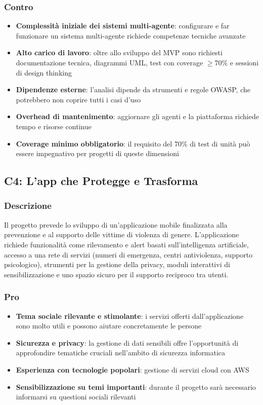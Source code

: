 \documentclass[11pt,a4paper]{article}
\begin{document}
\subsubsection{Contro}
\begin{itemize}
    \item \textbf{Complessità iniziale dei sistemi multi-agente}: configurare e far funzionare un sistema multi-agente richiede competenze tecniche avanzate
    \item \textbf{Alto carico di lavoro}: oltre allo sviluppo del MVP sono richiesti documentazione tecnica, diagrammi UML, test con coverage $\geq$70\% e sessioni di design thinking
    \item \textbf{Dipendenze esterne}: l'analisi dipende da strumenti e regole OWASP, che potrebbero non coprire tutti i casi d'uso
    \item \textbf{Overhead di mantenimento}: aggiornare gli agenti e la piattaforma richiede tempo e risorse continue
    \item \textbf{Coverage minimo obbligatorio}: il requisito del 70\% di test di unità può essere impegnativo per progetti di queste dimensioni
\end{itemize}

\vspace{0.5cm}
\subsection{C4: L'app che Protegge e Trasforma}

\subsubsection{Descrizione}
Il progetto prevede lo sviluppo di un'applicazione mobile finalizzata alla prevenzione e al supporto delle vittime di violenza di genere. L'applicazione richiede funzionalità come rilevamento e alert basati sull'intelligenza artificiale, accesso a una rete di servizi (numeri di emergenza, centri antiviolenza, supporto psicologico), strumenti per la gestione della privacy, moduli interattivi di sensibilizzazione e uno spazio sicuro per il supporto reciproco tra utenti.

\subsubsection{Pro}
\begin{itemize}
    \item \textbf{Tema sociale rilevante e stimolante}: i servizi offerti dall'applicazione sono molto utili e possono aiutare concretamente le persone
    \item \textbf{Sicurezza e privacy}: la gestione di dati sensibili offre l'opportunità di approfondire tematiche cruciali nell'ambito di sicurezza informatica
    \item \textbf{Esperienza con tecnologie popolari}: gestione di servizi cloud con AWS
    \item \textbf{Sensibilizzazione su temi importanti}: durante il progetto sarà necessario informarsi su questioni sociali rilevanti
\end{itemize}
\end{document}
